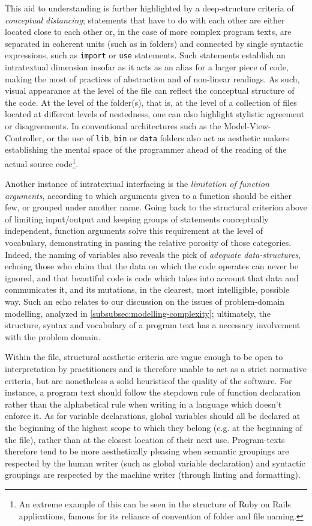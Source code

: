 This aid to understanding is further highlighted by a deep-structure criteria of \emph{conceptual distancing}; statements that have to do with each other are either located close to each other or, in the case of more complex program texts, are separated in coherent units (such as in folders) and connected by single syntactic expressions, such as \lstinline{import} or \lstinline{use} statements. Such statements establish an intratextual dimension insofar as it acts as an alias for a larger piece of code, making the most of practices of abstraction and of non-linear readings. As such, visual appearance at the level of the file can reflect the conceptual structure of the code. At the level of the folder(s), that is, at the level of a collection of files located at different levels of nestedness, one can also highlight stylistic agreement or disagreements. In conventional architectures such as the Model-View-Controller, or the use of \lstinline{lib}, \lstinline{bin} or \lstinline{data} folders also act as aesthetic makers establishing the mental space of the programmer ahead of the reading of the actual source code\footnote{An extreme example of this can be seen in the structure of Ruby on Rails applications, famous for its reliance of convention of folder and file naming.}.

Another instance of intratextual interfacing is the \emph{limitation of function arguments}, according to which arguments given to a function should be either few, or grouped under another name. Going back to the structural criterion above of limiting input/output and keeping groups of statements conceptually independent, function arguments solve this requirement at the level of vocabulary, demonstrating in passing the relative porosity of those categories. Indeed, the naming of variables also reveals the pick of \emph{adequate data-structures}, echoing those who claim that the data on which the code operates can never be ignored, and that beautiful code is code which takes into account that data and communicates it, and its mutations, in the clearest, most intelligible, possible way. Such an echo relates to our discussion on the issues of problem-domain modelling, analyzed in \autoref{subsubsec:modelling-complexity}; ultimately, the structure, syntax and vocabulary of a program text has a necessary involvement with the problem domain.

Within the file, structural aesthetic criteria are vague enough to be open to interpretation by practitioners and is therefore unable to act as a strict normative criteria, but are nonetheless a solid heuristicof the quality of the software. For instance, a program text should follow the stepdown rule of function declaration rather than the alphabetical rule when writing in a language which doesn't enforce it. As for variable declarations, global variables should all be declared at the beginning of the highest scope to which they belong (e.g. at the beginning of the file), rather than at the closest location of their next use. Program-texts therefore tend to be more aesthetically pleasing when semantic groupings are respected by the human writer (such as global variable declaration) and syntactic groupings are respected by the machine writer (through linting and formatting).

